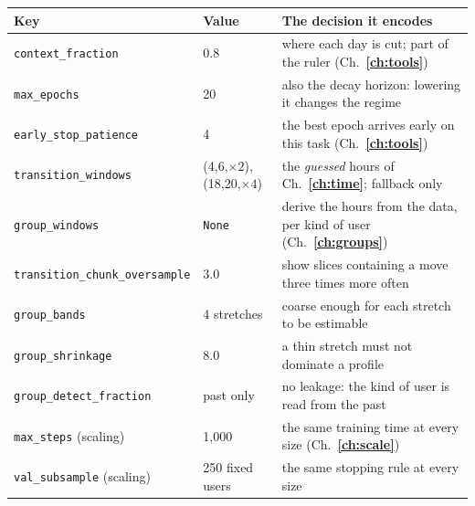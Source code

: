 \bigskip
\begin{minipage}{\textwidth}
\centering\footnotesize
{}
\label{tab:config-keys}
\begin{tabular}{@{}ll>{\raggedright\arraybackslash}p{6.7cm}@{}}
\toprule
\textbf{Key} & \textbf{Value} & \textbf{The decision it encodes} \\
\midrule
\texttt{context\_fraction}              & 0.8            & where each day is cut; part of the ruler (Ch.~\textbf{\ref{ch:tools}}) \\
\texttt{max\_epochs}                    & 20             & also the decay horizon: lowering it changes the regime \\
\texttt{early\_stop\_patience}           & 4              & the best epoch arrives early on this task (Ch.~\textbf{\ref{ch:tools}}) \\
\texttt{transition\_windows}             & (4,6,$\times2$), (18,20,$\times4$) & the \emph{guessed} hours of Ch.~\textbf{\ref{ch:time}}; fallback only \\
\texttt{group\_windows}                  & \texttt{None}  & derive the hours from the data, per kind of user (Ch.~\textbf{\ref{ch:groups}}) \\
\texttt{transition\_chunk\_oversample}   & 3.0            & show slices containing a move three times more often \\
\texttt{group\_bands}                    & 4 stretches    & coarse enough for each stretch to be estimable \\
\texttt{group\_shrinkage}                & 8.0            & a thin stretch must not dominate a profile \\
\texttt{group\_detect\_fraction}         & past only      & no leakage: the kind of user is read from the past \\
\texttt{max\_steps} (scaling)            & 1{,}000        & the same training time at every size (Ch.~\textbf{\ref{ch:scale}}) \\
\texttt{val\_subsample} (scaling)        & 250 fixed users & the same stopping rule at every size \\
\bottomrule
\end{tabular}
\end{minipage}
